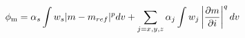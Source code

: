 \vspace{-0.1cm}
\begin{equation}
\phi_{\rm m} =
    {\alpha_s}\int w_s
    |m-m_{ref}|^p dv
     +
    \sum_{j=x,y,z}{\alpha_j}\int w_j
    \left|\frac{\partial m}{\partial i}\right|^q dv
\label{eq:model_regularization}
\end{equation}

